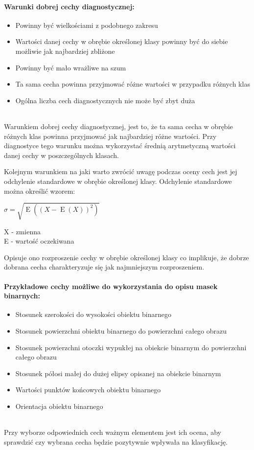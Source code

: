 \documentclass[a4paper,12pt,twoside,openany]{report}
\begin{document}
\paragraph{Warunki dobrej cechy diagnostycznej: }
\begin{itemize}
	\item Powinny być wielkościami z podobnego zakresu
	\item Wartości danej cechy w obrębie określonej klasy powinny być do siebie możliwie jak najbardziej zbliżone
	\item Powinny być mało wrażliwe na szum
	\item Ta sama cecha powinna przyjmować różne wartości w przypadku różnych klas
	\item Ogólna liczba cech diagnostycznych nie może być zbyt duża \cite{Osowski}
\end{itemize}
\mbox{} \\
Warunkiem dobrej cechy diagnostycznej, jest to, że ta sama cecha w obrębie różnych klas powinna przyjmować jak najbardziej różne wartości. Przy diagnostyce tego warunku można wykorzystać średnią arytmetyczną wartości danej cechy w poszczególnych klasach.

Kolejnym warunkiem na jaki warto zwrócić uwagę podczas oceny cech jest jej odchylenie standardowe w obrębie określonej klasy. Odchylenie standardowe można określić wzorem: 
\begin{center}
	{\large $ \sigma = {\sqrt {\operatorname {E} ((X-\operatorname {E} (X))^{2})}} $ \par}
\end{center}
X - zmienna \\
E - wartość oczekiwana 


Opisuje ono rozproszenie cechy w obrębie określonej klasy co implikuje, że dobrze dobrana cecha charakteryzuje się jak najmniejszym rozproszeniem.

\paragraph{Przykładowe cechy możliwe do wykorzystania do opisu masek binarnych: }
\begin{itemize}
	\item Stosunek szerokości do wysokości obiektu binarnego
	\item Stosunek powierzchni obiektu binarnego do powierzchni całego obrazu
	\item Stosunek powierzchni otoczki wypukłej na obiekcie binarnym do powierzchni całego obrazu
	\item Stosunek półosi małej do dużej elipsy opisanej na obiekcie binarnym 
	\item Wartości punktów końcowych obiektu binarnego
	\item Orientacja obiektu binarnego
\end{itemize}
\mbox{} \\
Przy wyborze odpowiednich cech ważnym elementem jest ich ocena, aby sprawdzić czy wybrana cecha będzie pozytywnie wpływała na klasyfikację.
\end{document}
